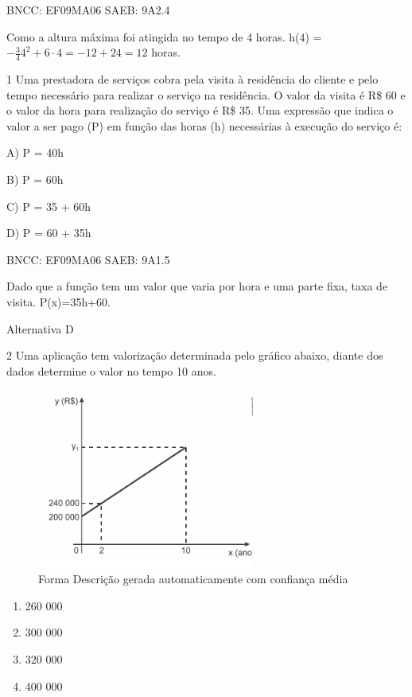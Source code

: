 \begin{escolha}
{{{\begin{escolha}
{BNCC: EF09MA06 SAEB: 9A2.4

Como a altura máxima foi atingida no tempo de 4 horas. h(4) =
\(- \frac{3}{4}4^{2} + 6 \cdot 4 = - 12 + 24 = 12\) horas.


\num{1} Uma prestadora de serviços cobra pela visita à residência do
cliente e pelo tempo necessário para realizar o serviço na residência. O
valor da visita é R\$ 60 e o valor da hora para realização do serviço é
R\$ 35. Uma expressão que indica o valor a ser pago (P) em função das
horas (h) necessárias à execução do serviço é:

A) P = 40h

B) P = 60h

C) P = 35 + 60h

D) P = 60 + 35h

BNCC: EF09MA06 SAEB: 9A1.5

Dado que a função tem um valor que varia por hora e uma parte fixa, taxa
de visita. P(x)=35h+60.

Alternativa D

\num{2} Uma aplicação tem valorização determinada pelo gráfico abaixo,
diante dos dados determine o valor no tempo 10 anos.

\begin{figure}
\centering
\includegraphics[width=2.80858in,height=2.3252in]{./_SAEB_9_MAT/media/image155.png}
\caption{Forma Descrição gerada automaticamente com confiança média}
\end{figure}

\begin{enumerate}

\item
  260 000
\item
  300 000
\item
  320 000
\item
  400 000
\end{enumerate}

}
\end{escolha}}}}
\end{escolha}

